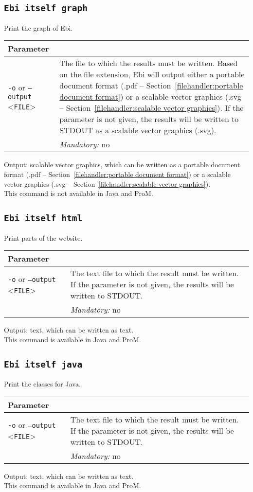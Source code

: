{\subsection{\texttt{Ebi itself graph}}
\label{command:Ebi itself graph}
Print the graph of Ebi.\\
\begin{tabularx}{\linewidth}{lX}
\toprule
Parameter \\\midrule
\texttt{-o} or \texttt{--output} <\texttt{FILE}> &
The file to which the results must be written. Based on the file extension, Ebi will output either a portable document format (.pdf -- Section~\ref{filehandler:portable document format}) or a scalable vector graphics (.svg -- Section~\ref{filehandler:scalable vector graphics}).
If the parameter is not given, the results will be written to STDOUT as a scalable vector graphics (.svg).\\
&\textit{Mandatory:} \quad no\\
\bottomrule
\end{tabularx}
\noindent Output: scalable vector graphics, which can be written as a portable document format (.pdf -- Section~\ref{filehandler:portable document format}) or a scalable vector graphics (.svg -- Section~\ref{filehandler:scalable vector graphics}).
\\This command is not available in Java and ProM.
\subsection{\texttt{Ebi itself html}}
\label{command:Ebi itself html}
Print parts of the website.\\
\begin{tabularx}{\linewidth}{lX}
\toprule
Parameter \\\midrule
\texttt{-o} or \texttt{--output} <\texttt{FILE}> &
The text file to which the result must be written. If the parameter is not given, the results will be written to STDOUT.\\
&\textit{Mandatory:} \quad no\\
\bottomrule
\end{tabularx}
\noindent Output: text, which can be written as  text.
\\This command is available in Java and ProM.
\subsection{\texttt{Ebi itself java}}
\label{command:Ebi itself java}
Print the classes for Java.\\
\begin{tabularx}{\linewidth}{lX}
\toprule
Parameter \\\midrule
\texttt{-o} or \texttt{--output} <\texttt{FILE}> &
The text file to which the result must be written. If the parameter is not given, the results will be written to STDOUT.\\
&\textit{Mandatory:} \quad no\\
\bottomrule
\end{tabularx}
\noindent Output: text, which can be written as  text.
\\This command is available in Java and ProM.
}
